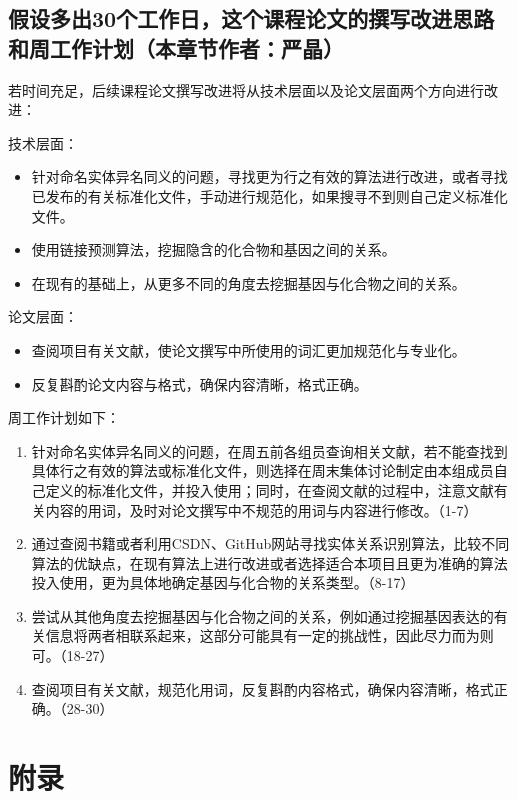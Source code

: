 \documentclass[twocolumn]{article}
\begin{document}
\subsection{假设多出30个工作日，这个课程论文的撰写改进思路和周工作计划（本章节作者：严晶）}
若时间充足，后续课程论文撰写改进将从技术层面以及论文层面两个方向进行改进：\par
技术层面：
\begin{itemize}
	\item 针对命名实体异名同义的问题，寻找更为行之有效的算法进行改进，或者寻找已发布的有关标准化文件，手动进行规范化，如果搜寻不到则自己定义标准化文件。
	\item 使用链接预测算法，挖掘隐含的化合物和基因之间的关系。
	\item 在现有的基础上，从更多不同的角度去挖掘基因与化合物之间的关系。
\end{itemize}\par
论文层面：
\begin{itemize}
	\item 查阅项目有关文献，使论文撰写中所使用的词汇更加规范化与专业化。
	\item 反复斟酌论文内容与格式，确保内容清晰，格式正确。
\end{itemize}\par
周工作计划如下：\par
\begin{enumerate}
	\item 针对命名实体异名同义的问题，在周五前各组员查询相关文献，若不能查找到具体行之有效的算法或标准化文件，则选择在周末集体讨论制定由本组成员自己定义的标准化文件，并投入使用；同时，在查阅文献的过程中，注意文献有关内容的用词，及时对论文撰写中不规范的用词与内容进行修改。（1-7）
	\item 通过查阅书籍或者利用CSDN、GitHub网站寻找实体关系识别算法，比较不同算法的优缺点，在现有算法上进行改进或者选择适合本项目且更为准确的算法投入使用，更为具体地确定基因与化合物的关系类型。（8-17）
	\item 尝试从其他角度去挖掘基因与化合物之间的关系，例如通过挖掘基因表达的有关信息将两者相联系起来，这部分可能具有一定的挑战性，因此尽力而为则可。（18-27）
	\item 查阅项目有关文献，规范化用词，反复斟酌内容格式，确保内容清晰，格式正确。（28-30）
\end{enumerate}





\section{\label{chap:supp}附录}
\end{document}
